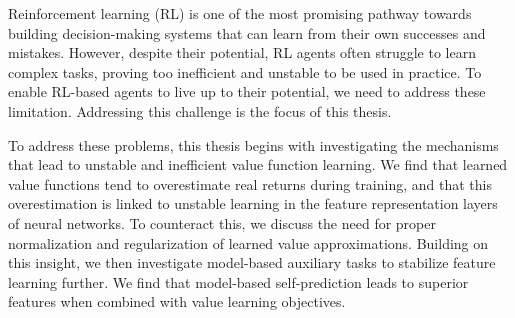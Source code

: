 Reinforcement learning (RL) is one of the most promising pathway towards building decision-making systems that can learn from their own successes and mistakes.
However, despite their potential, RL agents often struggle to learn complex tasks, proving too inefficient and unstable to be used in practice.
To enable RL-based agents to live up to their potential, we need to address these limitation.
Addressing this challenge is the focus of this thesis.

% 
% 

To address these problems, this thesis begins with investigating the mechanisms that lead to unstable and inefficient value function learning.
We find that learned value functions tend to overestimate real returns during training, and that this overestimation is linked to unstable learning in the feature representation layers of neural networks.
To counteract this, we discuss the need for proper normalization and regularization of learned value approximations.
Building on this insight, we then investigate model-based auxiliary tasks to stabilize feature learning further.
We find that model-based self-prediction leads to superior features when combined with value learning objectives.

